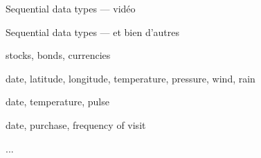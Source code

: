 \begin{frame}{Sequential data types --- vidéo}
\end{frame}

\begin{frame}{Sequential data types --- et bien d'autres}
  \begin{description}
    \item[Economy] stocks, bonds, currencies
    \item[Weather] date, latitude, longitude, temperature, pressure, wind, rain
    \item[Health] date, temperature, pulse
    \item[Customer Behaviors] date, purchase, frequency of visit
    \item ...
    \end{description}
\end{frame}
